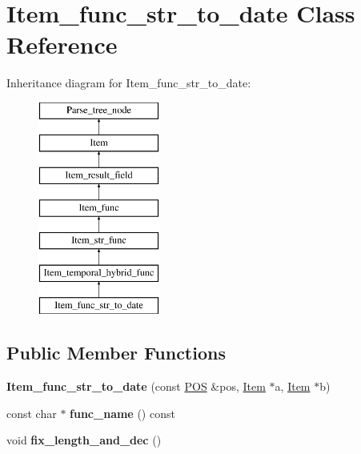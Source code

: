 \hypertarget{classItem__func__str__to__date}{}\section{Item\+\_\+func\+\_\+str\+\_\+to\+\_\+date Class Reference}
\label{classItem__func__str__to__date}
Inheritance diagram for Item\+\_\+func\+\_\+str\+\_\+to\+\_\+date\+:\begin{figure}[H]
\begin{center}
\leavevmode
\includegraphics[height=7.000000cm]{classItem__func__str__to__date}
\end{center}
\end{figure}
\subsection*{Public Member Functions}
\begin{DoxyCompactItemize}
\item 
\mbox{\label{classItem__func__str__to__date_a4c1c6fd32d5575263f8a4162ff877aa2}} 
{\bfseries Item\+\_\+func\+\_\+str\+\_\+to\+\_\+date} (const \mbox{\hyperlink{structYYLTYPE}{P\+OS}} \&pos, \mbox{\hyperlink{classItem}{Item}} $\ast$a, \mbox{\hyperlink{classItem}{Item}} $\ast$b)
\item 
\mbox{\label{classItem__func__str__to__date_ad40ec661a88493a8fb849ccf6ab20243}} 
const char $\ast$ {\bfseries func\+\_\+name} () const
\item 
\mbox{\label{classItem__func__str__to__date_a548c6d7ea68f37cd9582787593426648}} 
void {\bfseries fix\+\_\+length\+\_\+and\+\_\+dec} ()
\end{DoxyCompactItemize}
